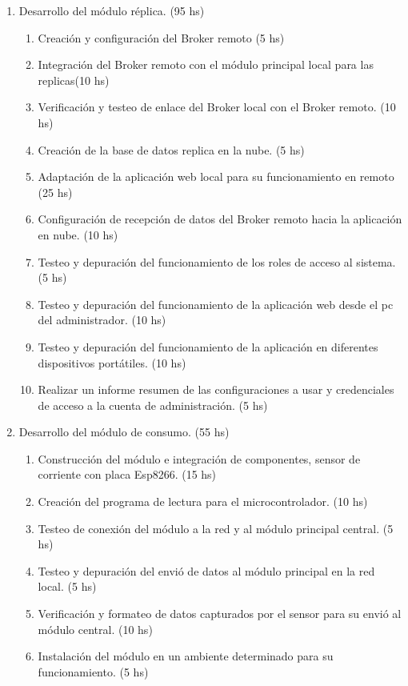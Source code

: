 \documentclass[11pt]{charter}
\begin{document}
\begin{enumerate}
\item Desarrollo del módulo réplica. (95 hs)
	\begin{enumerate}
	\item Creación y configuración del Broker remoto (5 hs)
	\item Integración del Broker remoto con el módulo principal local para las replicas(10 hs)
	\item Verificación y testeo de enlace del Broker local con el Broker remoto. (10 hs)
	\item Creación de la base de datos replica en la nube. (5 hs) 
	\item Adaptación de la aplicación web local para su funcionamiento en remoto  (25 hs)
	\item Configuración de recepción de datos del Broker remoto hacia la aplicación en nube.  (10 hs)
	\item Testeo y depuración del funcionamiento de los roles de acceso al sistema. (5 hs) 
	\item Testeo y depuración del funcionamiento de la aplicación web desde el pc del administrador. (10 hs) 
	\item Testeo y depuración del funcionamiento de la aplicación en diferentes dispositivos portátiles. (10 hs)
	\item Realizar un informe resumen de las configuraciones a usar y credenciales de acceso a la cuenta de administración. (5 hs)
	\end{enumerate}
\item Desarrollo del módulo de consumo. (55 hs)
	\begin{enumerate}
	\item Construcción del módulo e integración de componentes, sensor de corriente con placa Esp8266. (15 hs)
	\item Creación del programa de lectura para el microcontrolador. (10 hs)
	\item Testeo de conexión del módulo a la red y al módulo principal central. (5 hs)
	\item Testeo y depuración del envió de datos al módulo principal en la red local. (5 hs)
	\item Verificación y formateo de datos capturados por el sensor para su envió al módulo central. (10 hs)
	\item Instalación del módulo en un ambiente determinado para su funcionamiento. (5 hs)

\end{enumerate}
\end{enumerate}
\end{document}
